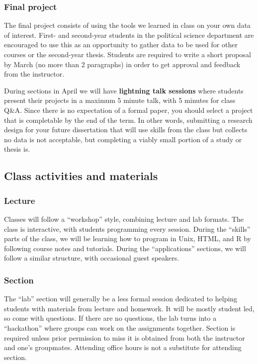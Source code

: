 \documentclass[
]{book}
\begin{document}
\hypertarget{final-project}{%
\subsubsection{Final project}\label{final-project}}

The final project consists of using the tools we learned in class on your own data of interest. First- and second-year students in the political science department are encouraged to use this as an opportunity to gather data to be used for other courses or the second-year thesis. Students are required to write a short proposal by March (no more than 2 paragraphs) in order to get approval and feedback from the instructor.

During sections in April we will have \textbf{lightning talk sessions} where students present their projects in a maximum 5 minute talk, with 5 minutes for class Q\&A. Since there is no expectation of a formal paper, you should select a project that is completable by the end of the term. In other words, submitting a research design for your future dissertation that will use skills from the class but collects no data is not acceptable, but completing a viably small portion of a study or thesis is.

\hypertarget{class-activities-and-materials}{%
\subsection{Class activities and materials}\label{class-activities-and-materials}}

\hypertarget{lecture}{%
\subsubsection{Lecture}\label{lecture}}

Classes will follow a ``workshop'' style, combining lecture and lab formats. The class is interactive, with students programming every session. During the ``skills'' parts of the class, we will be learning how to program in Unix, HTML, and R by following course notes and tutorials. During the ``applications'' sections, we will follow a similar structure, with occasional guest speakers.

\hypertarget{section}{%
\subsubsection{Section}\label{section}}

The ``lab'' section will generally be a less formal session dedicated to helping students with materials from lecture and homework. It will be mostly student led, so come with questions. If there are no questions, the lab turns into a ``hackathon'' where groups can work on the assignments together. Section is required unless prior permission to miss it is obtained from both the instructor and one's groupmates. Attending office hours is not a substitute for attending section.
\end{document}
